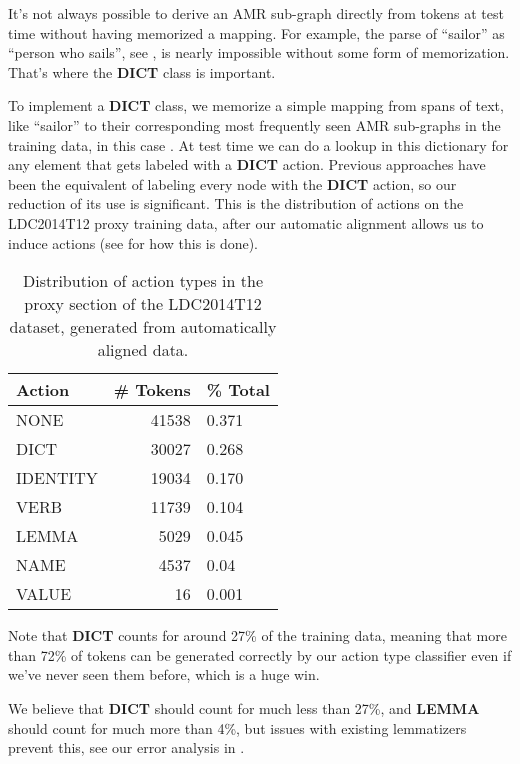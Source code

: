 \documentclass[11pt]{article}
\begin{document}

It's not always possible to derive an AMR sub-graph directly from tokens at test time without having memorized a mapping. For example, the parse of ``sailor'' as ``person who sails'', see , is nearly impossible without some form of memorization. That's where the \textbf{DICT} class is important.

To implement a \textbf{DICT} class, we memorize a simple mapping from spans of text, like ``sailor'' to their corresponding most frequently seen AMR sub-graphs in the training data, in this case . At test time we can do a lookup in this dictionary for any element that gets labeled with a \textbf{DICT} action. Previous approaches have been the equivalent of labeling every node with the \textbf{DICT} action, so our reduction of its use is significant. This is the distribution of actions on the LDC2014T12 proxy training data, after our automatic alignment allows us to induce actions (see  for how this is done).

\begin{table}[h]
\begin{center}
\begin{tabular}{|l|rl|}
\hline \bf Action & \bf \# Tokens & \bf \% Total \\ \hline
NONE & 41538 & 0.371\\
DICT & 30027 & 0.268 \\
IDENTITY & 19034 & 0.170 \\
VERB & 11739 & 0.104 \\
LEMMA & 5029 & 0.045 \\
NAME & 4537 & 0.04 \\
VALUE & 16  & 0.001\\
\hline
\end{tabular}
\end{center}
\caption{\label{font-table} Distribution of action types in the proxy section of the LDC2014T12 dataset, generated from automatically aligned data. }
\end{table}

Note that \textbf{DICT} counts for around 27\% of the training data, meaning that more than 72\% of tokens can be generated correctly by our action type classifier even if we've never seen them before, which is a huge win.

We believe that \textbf{DICT} should count for much less than 27\%, and \textbf{LEMMA} should count for much more than 4\%, but issues with existing lemmatizers prevent this, see our error analysis in .
\end{document}
